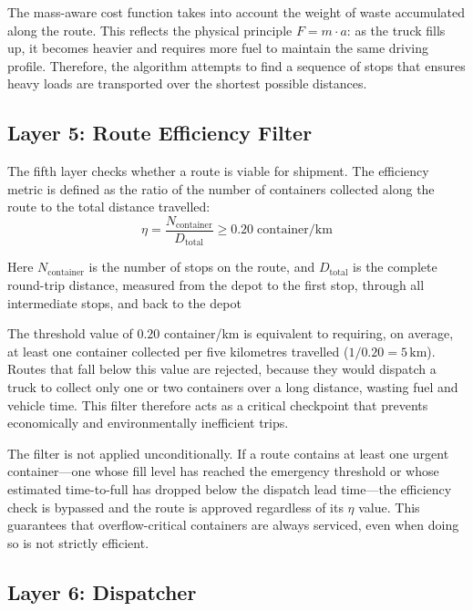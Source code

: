 \documentclass[12pt,a4paper]{report}
\begin{document}
\indent The mass-aware cost function takes into account the weight of waste accumulated along the route. This reflects the physical principle $F = m \cdot a$: as the truck fills up, it becomes heavier and requires more fuel to maintain the same driving profile. Therefore, the algorithm attempts to find a sequence of stops that ensures heavy loads are transported over the shortest possible distances.

\subsection{Layer 5: Route Efficiency Filter}

\indent The fifth layer checks whether a route is viable for shipment.
The efficiency metric is defined as the ratio of the number of containers
collected along the route to the total distance travelled:
\begin{equation}
  \eta = \frac{N_{\text{container}}}{D_{\text{total}}} \geq 0.20 \;\text{container/km}
  \label{eq:efficiency}
\end{equation}

\indent Here $N_{\text{container}}$ is the number of stops on the route, and
$D_{\text{total}}$ is the complete round-trip distance, measured from the depot
to the first stop, through all intermediate stops, and back to the depot


\indent The threshold value of $0.20$ container/km is equivalent to requiring,
on average, at least one container collected per five kilometres travelled
($1/0.20 = 5\,\text{km}$). Routes that fall below this value are rejected,
because they would dispatch a truck to collect only one or two containers over
a long distance, wasting fuel and vehicle time. This filter therefore acts as a
critical checkpoint that prevents economically and environmentally inefficient
trips.


\indent The filter is not applied unconditionally. If a route contains at least
one urgent container---one whose fill level has reached the emergency threshold
or whose estimated time-to-full has dropped below the dispatch lead time---the
efficiency check is bypassed and the route is approved regardless of its
$\eta$ value. This guarantees that overflow-critical containers are always
serviced, even when doing so is not strictly efficient.

\subsection{Layer 6: Dispatcher}
\end{document}
